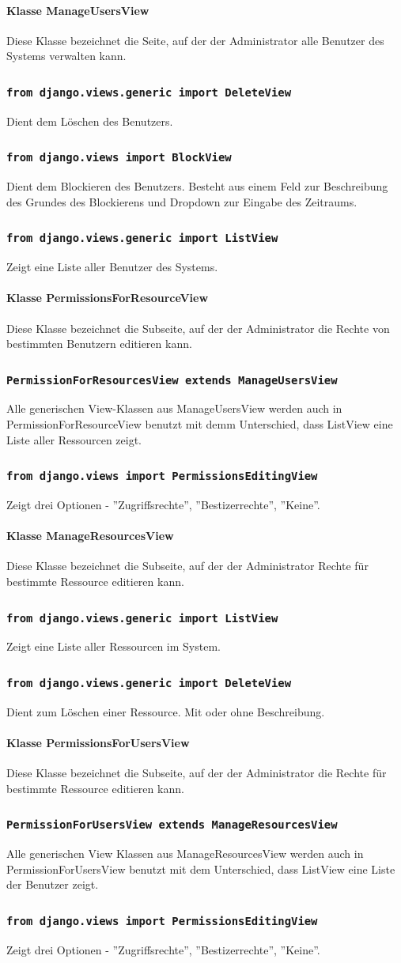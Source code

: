 \documentclass[parskip=full,11pt]{scrartcl}
\newcommand{\class}[1]{\subsubsection*{\lstinline[basicstyle=\ttfamily\large]{#1}}}
\begin{document}
\paragraph*{Klasse ManageUsersView}
Diese Klasse bezeichnet die Seite, auf der der Administrator alle Benutzer des Systems verwalten kann.
\class{from django.views.generic import DeleteView}
Dient dem Löschen des Benutzers.
\class{from django.views import BlockView}
Dient dem Blockieren des Benutzers. Besteht aus einem Feld zur Beschreibung des Grundes des Blockierens und Dropdown zur Eingabe des Zeitraums.
\class{from django.views.generic import ListView}
Zeigt eine Liste aller Benutzer des Systems.

\paragraph*{Klasse PermissionsForResourceView}
 Diese Klasse bezeichnet die Subseite, auf der der Administrator die Rechte von bestimmten Benutzern editieren kann.
 \class{PermissionForResourcesView extends ManageUsersView}
 Alle generischen View-Klassen aus ManageUsersView werden auch in PermissionForResourceView benutzt mit demm Unterschied, dass ListView eine Liste aller Ressourcen zeigt.
 \class{from django.views import PermissionsEditingView}
 Zeigt drei Optionen - ''Zugriffsrechte'', ''Bestizerrechte'', ''Keine''.
 
\paragraph*{Klasse ManageResourcesView}
Diese Klasse bezeichnet die Subseite, auf der der Administrator Rechte für bestimmte Ressource editieren kann.
\class{from django.views.generic import ListView}
Zeigt eine Liste aller Ressourcen im System.
\class{from django.views.generic import DeleteView}
Dient zum Löschen einer Ressource. Mit oder ohne Beschreibung.

\paragraph*{Klasse PermissionsForUsersView}
 Diese Klasse bezeichnet die Subseite, auf der der Administrator die Rechte für bestimmte Ressource editieren kann.
 \class{PermissionForUsersView extends ManageResourcesView}
 Alle generischen View Klassen aus ManageResourcesView werden auch in PermissionForUsersView benutzt mit dem Unterschied, dass ListView eine Liste der Benutzer zeigt.
 \class{from django.views import PermissionsEditingView}
 Zeigt drei Optionen - ''Zugriffsrechte'', ''Bestizerrechte'', ''Keine''.
\end{document}
